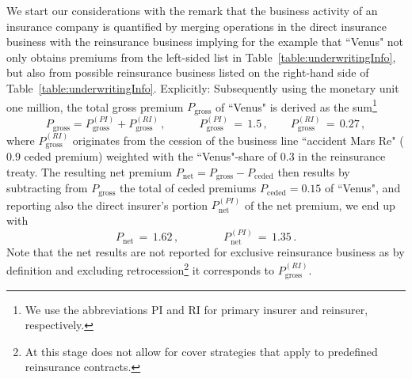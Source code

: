 {We start our considerations with the remark that the business activity of an insurance
company is quantified by merging operations in the direct insurance business with the
reinsurance business implying for the example that ``Venus" not only obtains premiums from
the left-sided list in Table~\ref{table:underwritingInfo}, but also from possible
reinsurance business listed on the right-hand side of Table~\ref{table:underwritingInfo}.
Explicitly: Subsequently using the monetary unit one million, the total gross premium
$P_{\mathrm{gross}}$ of ``Venus" is derived as the sum\footnote{We use the abbreviations PI
and RI for primary insurer and reinsurer, respectively.}
\begin{equation*}
P_{\mathrm{gross}}= P_{\mathrm{gross}}^{\scriptscriptstyle{(PI)}}+
P_{\mathrm{gross}}^{\scriptscriptstyle{(RI)}}\,,
\qquad\quad P_{\mathrm{gross}}^{\scriptscriptstyle{(PI)}}\,=
\,1.5\,,\qquad P_{\mathrm{gross}}^{\scriptscriptstyle{(RI)}}\,=
\,0.27\,,
\end{equation*}
where $P_{\mathrm{gross}}^{\scriptscriptstyle{(RI)}}$ originates from the cession of the
business line ``accident Mars Re" ($0.9$ ceded premium) weighted with the ``Venus"-share of
$0.3$ in the reinsurance treaty.
The resulting net premium $P_{\mathrm{net}}=P_{\mathrm{gross}}-P_{\mathrm{ceded}}$ then
results by subtracting from $P_{\mathrm{gross}}$ the total of ceded premiums
$P_{\mathrm{ceded}}=0.15$ of ``Venus", and reporting also the direct insurer's portion
$P_{\mathrm{net}}^{\scriptscriptstyle{(PI)}}$ of the net premium, we end up with
\[  P_{\mathrm{net}} \,=\,1.62 \,,\qquad\qquad  P_{\mathrm{net}}^{\scriptscriptstyle{(PI)}}\,=\,1.35\,.\]
Note that the net results are not reported for exclusive reinsurance business as by
definition and excluding retrocession\footnote{At this stage \PillarOne{} does 
not allow for cover strategies that apply to predefined reinsurance contracts.}
 it corresponds to
$P_{\mathrm{gross}}^{\scriptscriptstyle{(RI)}}$.

}
